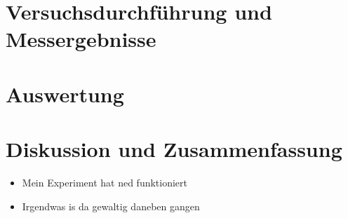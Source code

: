\documentclass[11pt]{scrartcl}
\begin{document}
\section{Versuchsdurchführung und Messergebnisse}
\label{sec:versuchsdurchfuehrung_messergebnisse}

\section{Auswertung}
\label{sec:auswertung}

\section{Diskussion und Zusammenfassung}
\label{sec:diskussion_zusammenfassung}
\begin{itemize}
    \item Mein Experiment hat ned funktioniert
    \item Irgendwas is da gewaltig daneben gangen
\end{itemize}



\listoffigures

\listoftables
\end{document}

